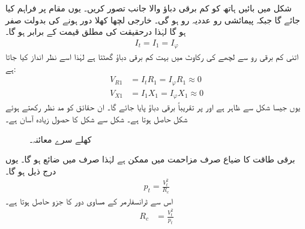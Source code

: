 شکل    میں بائیں ہاتھ  کو کم برقی دباؤ والا جانب تصور کریں۔ یوں  مقام   پر فراہم کیا جائے گا جبکہ پیمائشی رو عددیہ رو  ہو  گی۔ خارجی لچھا کھلا دور ہونے کی بدولت   صفر  ہو گا  لہٰذا   درحقیقت  کی مطلق قیمت  کے برابر ہو گا۔
\begin{align*}
I_t=I_1=I_\varphi
\end{align*}
اتنی کم برقی رو سے لچھے کی  رکاوٹ میں بہت کم برقی دباؤ گھٹتا ہے لہٰذا اسے نظر انداز کیا جاتا ہے:
\begin{align*}
V_{R1}&=I_t R_1=I_\varphi R_1 \approx 0\\
V_{X1}&=I_1 X_1=I_\varphi X_1 \approx 0
\end{align*}
یوں  جیسا شکل   سے ظاہر ہے   اور  پر  تقریباً  برقی دباؤ پایا جائے گا۔ ان حقائق کو مد نظر رکھتے ہوئے شکل  حاصل ہوتا ہے۔ شکل  سے شکل  کا حصول  زیادہ آسان ہے۔
\begin{figure}
\centering
\caption{کھلے سرے معائنہ۔}
\label{شکل_ٹرانسفارمر_کھلے_سرے_معائنہ}
\end{figure}

برقی طاقت کا ضیاع صرف مزاحمت میں ممکن ہے لہٰذا  صرف    میں  ضائع ہو گا۔ یوں درج ذیل ہو گا۔
\begin{align*}
p_t=\frac{V_t^2}{R_c}
\end{align*}
اس سے ٹرانسفارمر کے مساوی دور کا جزو  حاصل ہوتا ہے۔
\begin{align}\label{مساوات_ٹرانسفارمر_کھلے_دور_مزاحمت_حاصل}
R_c&=\frac{V_t^2}{p_t}
\end{align}

